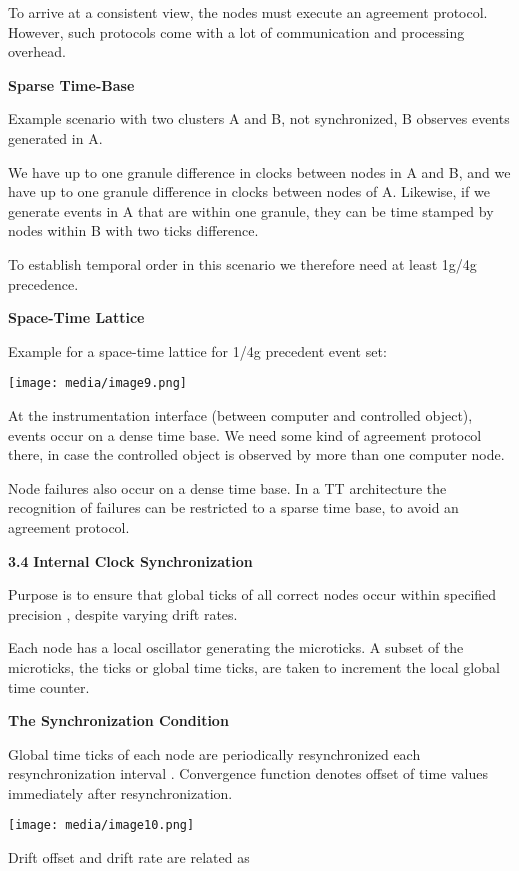 To arrive at a consistent view, the nodes must execute an agreement
protocol. However, such protocols come with a lot of communication and
processing overhead.

\textbf{Sparse Time-Base}

Example scenario with two clusters A and B, not synchronized, B observes
events generated in A.

We have up to one granule difference in clocks between nodes in A and B,
and we have up to one granule difference in clocks between nodes of A.
Likewise, if we generate events in A that are within one granule, they
can be time stamped by nodes within B with two ticks difference.

To establish temporal order in this scenario we therefore need at least
1g/4g precedence.

\textbf{Space-Time Lattice}

Example for a space-time lattice for 1/4g precedent event set:

\texttt{[image: media/image9.png]}

At the instrumentation interface (between computer and controlled
object), events occur on a dense time base. We need some kind of
agreement protocol there, in case the controlled object is observed by
more than one computer node.

Node failures also occur on a dense time base. In a TT architecture the
recognition of failures can be restricted to a sparse time base, to
avoid an agreement protocol.

\textbf{3.4} \protect\hypertarget{teil5}{}{}\textbf{Internal Clock
Synchronization}

Purpose is to ensure that global ticks of all correct nodes occur within
specified precision , despite varying drift rates.

Each node has a local oscillator generating the microticks. A subset of
the microticks, the ticks or global time ticks, are taken to increment
the local global time counter.

\textbf{The Synchronization Condition}

Global time ticks of each node are periodically resynchronized each
resynchronization interval . Convergence function denotes offset of time
values immediately after resynchronization.

\texttt{[image: media/image10.png]}

Drift offset and drift rate are related as

